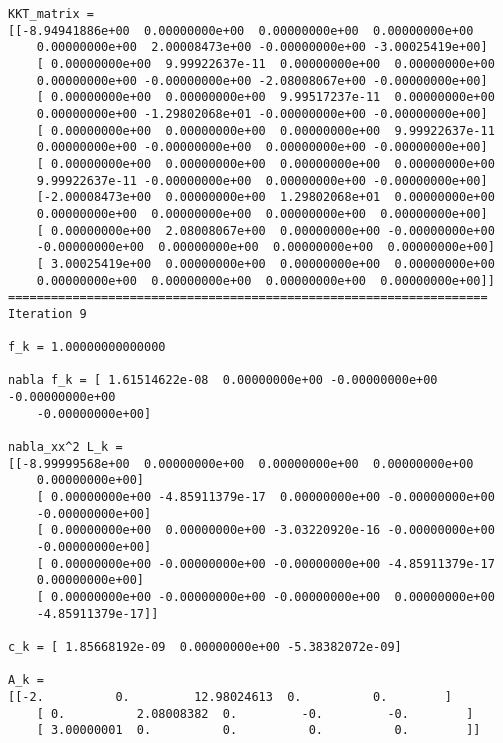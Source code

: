 \documentclass{article}
\begin{document}
\begin{verbatim}
KKT_matrix = 
[[-8.94941886e+00  0.00000000e+00  0.00000000e+00  0.00000000e+00
    0.00000000e+00  2.00008473e+00 -0.00000000e+00 -3.00025419e+00]
    [ 0.00000000e+00  9.99922637e-11  0.00000000e+00  0.00000000e+00
    0.00000000e+00 -0.00000000e+00 -2.08008067e+00 -0.00000000e+00]
    [ 0.00000000e+00  0.00000000e+00  9.99517237e-11  0.00000000e+00
    0.00000000e+00 -1.29802068e+01 -0.00000000e+00 -0.00000000e+00]
    [ 0.00000000e+00  0.00000000e+00  0.00000000e+00  9.99922637e-11
    0.00000000e+00 -0.00000000e+00  0.00000000e+00 -0.00000000e+00]
    [ 0.00000000e+00  0.00000000e+00  0.00000000e+00  0.00000000e+00
    9.99922637e-11 -0.00000000e+00  0.00000000e+00 -0.00000000e+00]
    [-2.00008473e+00  0.00000000e+00  1.29802068e+01  0.00000000e+00
    0.00000000e+00  0.00000000e+00  0.00000000e+00  0.00000000e+00]
    [ 0.00000000e+00  2.08008067e+00  0.00000000e+00 -0.00000000e+00
    -0.00000000e+00  0.00000000e+00  0.00000000e+00  0.00000000e+00]
    [ 3.00025419e+00  0.00000000e+00  0.00000000e+00  0.00000000e+00
    0.00000000e+00  0.00000000e+00  0.00000000e+00  0.00000000e+00]]
===================================================================
Iteration 9

f_k = 1.00000000000000

nabla f_k = [ 1.61514622e-08  0.00000000e+00 -0.00000000e+00 -0.00000000e+00
    -0.00000000e+00]

nabla_xx^2 L_k = 
[[-8.99999568e+00  0.00000000e+00  0.00000000e+00  0.00000000e+00
    0.00000000e+00]
    [ 0.00000000e+00 -4.85911379e-17  0.00000000e+00 -0.00000000e+00
    -0.00000000e+00]
    [ 0.00000000e+00  0.00000000e+00 -3.03220920e-16 -0.00000000e+00
    -0.00000000e+00]
    [ 0.00000000e+00 -0.00000000e+00 -0.00000000e+00 -4.85911379e-17
    0.00000000e+00]
    [ 0.00000000e+00 -0.00000000e+00 -0.00000000e+00  0.00000000e+00
    -4.85911379e-17]]

c_k = [ 1.85668192e-09  0.00000000e+00 -5.38382072e-09]

A_k = 
[[-2.          0.         12.98024613  0.          0.        ]
    [ 0.          2.08008382  0.         -0.         -0.        ]
    [ 3.00000001  0.          0.          0.          0.        ]]


\end{verbatim}
\end{document}
